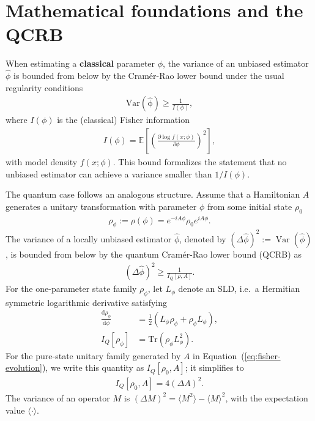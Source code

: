 \section{Mathematical foundations and the QCRB}
\label{sec:theory:qcrb}
When estimating a \textbf{classical} parameter $\phi$, the variance
of an unbiased estimator $\hat\phi$ is bounded from below by the Cramér-Rao 
lower bound under the usual regularity conditions
\begin{align}
\mathrm{Var(\hat\phi)} \geq \frac 1 {I(\phi)},
\end{align}
where $I(\phi)$ is the (classical) Fisher information \cite{petzINTRODUCTIONQUANTUMFISHER2011}
\begin{align}
I(\phi) = \mathbb{E}\left[ \left(\frac{\partial \log f(x;\phi)}{\partial \phi}\right)^2\right],
\end{align}
with model density $f(x;\phi)$.
This bound formalizes the statement that no unbiased
estimator can achieve a variance smaller than $1/I(\phi)$.

The quantum case follows an analogous structure. 
Assume that a Hamiltonian $A$ generates a unitary transformation with 
parameter $\phi$ from some initial state $\rho_0$
\begin{align}
\rho_\phi:=\rho(\phi)=e^{-i A \phi} \rho_0 e^{i A \phi}.
\label{eq:fisher-evolution}
\end{align}
The variance of a locally unbiased estimator $\hat\phi$, denoted by
$(\Delta\hat\phi)^2:=\operatorname{Var}(\hat\phi)$, is bounded from below by
the quantum Cramér-Rao lower bound (QCRB) as \cite{braunsteinStatisticalDistanceGeometry1994,parisQuantumEstimationQuantum2008a,liuQuantumFisherInformation2020a}
\begin{align}
    (\Delta \hat\phi)^2\geq \frac{1}{I_Q[\rho , A]}.
\end{align}
For the one-parameter state family $\rho_\phi$, let $L_\phi$ denote an SLD, i.e.\ a Hermitian symmetric logarithmic derivative satisfying
\cite{braunsteinStatisticalDistanceGeometry1994,parisQuantumEstimationQuantum2008a,liuQuantumFisherInformation2020a}
\begin{align}
    \frac{\mathrm d\rho_\phi}{\mathrm d\phi}
    &= \frac{1}{2}\left(L_\phi\rho_\phi+\rho_\phi L_\phi\right),
    \label{eq:sld-definition}\\
    I_Q[\rho_\phi]
    &= \mathrm{Tr}\!\left(\rho_\phi L_\phi^2\right).
    \label{eq:qfi-sld}
\end{align}
For the pure-state unitary family generated by $A$ in Equation~(\ref{eq:fisher-evolution}), we write this quantity as $I_Q[\rho_0,A]$; it simplifies to \cite{tothQuantumMetrologyQuantum2014,liuQuantumFisherInformation2020a}
\begin{align}
    I_Q[\rho_0,A] = 4(\Delta A)^2. \label{eq:fisher_pure_states}
\end{align}
The variance of an operator $M$ is $(\Delta M)^2=\langle M^2 \rangle - \langle M \rangle^2$, with the expectation value $\langle\cdot\rangle$.

